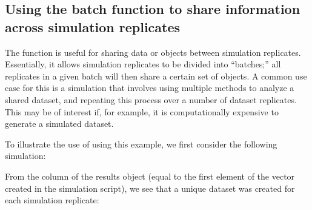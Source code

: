 \subsection{Using the batch function to share information across simulation replicates}

The  function is useful for sharing data or objects between simulation replicates. Essentially, it allows simulation replicates to be divided into ``batches;'' all replicates in a given batch will then share a certain set of objects. A common use case for this is a simulation that involves using multiple methods to analyze a shared dataset, and repeating this process over a number of dataset replicates. This may be of interest if, for example, it is computationally expensive to generate a simulated dataset.

To illustrate the use of  using this example, we first consider the following simulation:


From the  column of the results object (equal to the first element of the  vector created in the simulation script), we see that a unique dataset was created for each simulation replicate:



